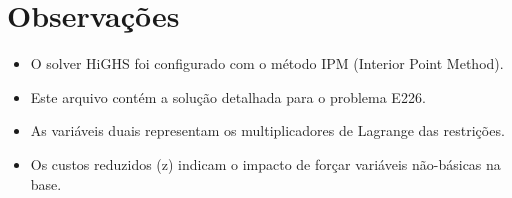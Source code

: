 \documentclass[12pt]{article}
\begin{document}
\section{Observações}

\begin{itemize}
\item O solver HiGHS foi configurado com o método IPM (Interior Point Method).
\item Este arquivo contém a solução detalhada para o problema E226.
\item As variáveis duais representam os multiplicadores de Lagrange das restrições.
\item Os custos reduzidos (z) indicam o impacto de forçar variáveis não-básicas na base.
\end{itemize}
\end{document}
